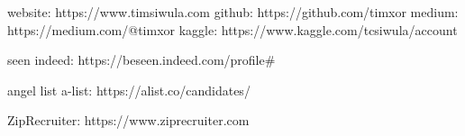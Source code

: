 %

website: https://www.timsiwula.com
github: https://github.com/timxor
medium: https://medium.com/@timxor
kaggle: https://www.kaggle.com/tcsiwula/account




seen indeed: https://beseen.indeed.com/profile#

angel list a-list: https://alist.co/candidates/

ZipRecruiter: https://www.ziprecruiter.com
